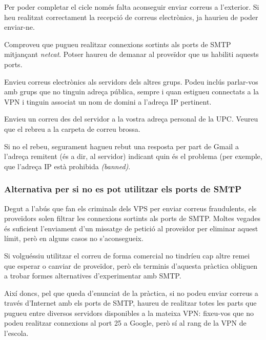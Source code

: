 \documentclass{practicaitic}
\begin{document}
Per poder completar el cicle només falta aconseguir enviar correus a l'exterior.
Si heu realitzat correctament la recepció de correus electrònics, ja haurieu
de poder enviar-ne.

\begin{previ}
  Comproveu que pugueu realitzar connexions sortints als ports de SMTP
  mitjançant \textit{netcat}. Potser haureu de demanar al proveïdor que
  us habiliti aquests ports.

\end{previ}

\begin{tasca}
  Envieu correus electrònics als servidors dels altres grups.
  Podeu inclús parlar-vos amb grups
  que no tinguin adreça pública, sempre i quan estigueu connectats
  a la VPN i tinguin associat un nom de domini a l'adreça IP pertinent.
\end{tasca}

\begin{tasca}
  Envieu un correu des del servidor a la vostra adreça personal de la UPC.
  Veureu que el rebreu a la carpeta de correu brossa.
  
  Si no el rebeu, segurament hagueu rebut una resposta per part de
  Gmail a l'adreça remitent (és a dir, al servidor) indicant quin és
  el problema (per exemple, que l'adreça IP està prohibida
  \textit{(banned)}. %
\end{tasca}

\subsubsection{Alternativa per si no es pot utilitzar els ports de SMTP}
\label{sec:plan-b}

Degut a l'abús que fan els criminals dels VPS per enviar correus
fraudulents, els proveïdors solen filtrar les connexions sortints als
ports de SMTP. Moltes vegades és suficient l'enviament d'un missatge
de petició al proveïdor per eliminar aquest límit, però en alguns
casos no s'aconsegueix.

Si volguéssiu utilitzar el correu de forma comercial no tindríeu cap
altre remei que esperar o canviar de proveïdor, però els terminis
d'aquesta pràctica obliguen a trobar formes alternatives d'experimentar
amb SMTP.

Així doncs, pel que queda d'enunciat de la pràctica, si no podeu
enviar correus a través d'Internet amb els ports de SMTP, haureu de realitzar
totes les parts que pugueu entre diversos servidors disponibles a la mateixa
VPN: fixeu-vos que no podeu realitzar connexions al port 25 a Google, però sí
al rang de la VPN de l'escola.
\end{document}
